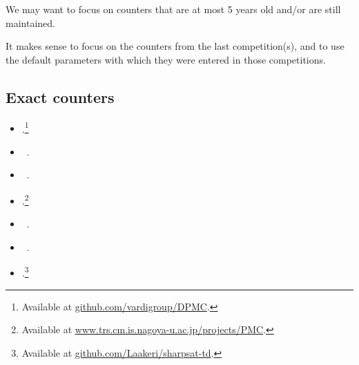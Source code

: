 \documentclass[a4paper]{tufte-handout}
\begin{document}
	\begin{counters}
		We may want to focus on counters that are at most 5 years old and/or are still maintained.
		
		It makes sense to focus on the counters from the last competition(s), and to use the default parameters with which they were entered in those competitions.
		
		\subsection*{Exact counters}
		\begin{itemize}
			\item \dpmc{}.\footnote{Available at \href{https://github.com/vardigroup/DPMC}{github.com/vardigroup/DPMC}.}
			\item \cachet{}~\citep{SBK05a}.
			\item \ganak{}~\citep{SSS+19}.
			\item \gpmc{}.\footnote{Available at \href{https://www.trs.cm.is.nagoya-u.ac.jp/projects/PMC/}{www.trs.cm.is.nagoya-u.ac.jp/projects/PMC}.}
			\item \exactmc{}~\citep{LNY21}.
			\item \sharpsat{}~\citep{Thu06}.
			\item \sharpsattd{}.\footnote{Available at \href{https://github.com/Laakeri/sharpsat-td}{github.com/Laakeri/sharpsat-td}.}
		\end{itemize}
	

\end{counters}
\end{document}
